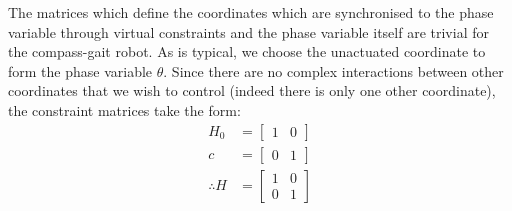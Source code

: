 The matrices which define the coordinates which are synchronised to the phase variable through virtual constraints and the phase variable itself are trivial for the compass-gait robot. As is typical, we choose the unactuated coordinate to form the phase variable $\theta$. Since there are no complex interactions between other coordinates that we wish to control (indeed there is only one other coordinate), the constraint matrices take the form:
\begin{align*}
	H_0 &= \begin{bmatrix}
		1 & 0
	\end{bmatrix} \\
	c &= \begin{bmatrix}
		0 & 1
	\end{bmatrix}\\
	\therefore H &= \begin{bmatrix}
		1 & 0 \\ 0 & 1
	\end{bmatrix}
\end{align*}